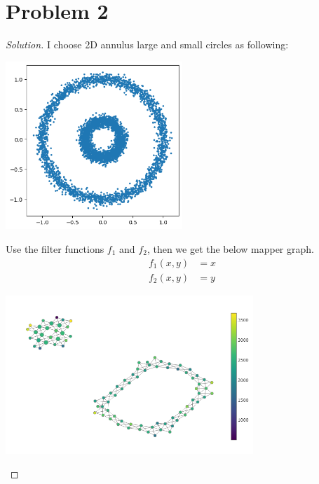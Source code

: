\section*{Problem 2}
	\begin{proof} [Solution]
		I choose 2D annulus large and small circles as following:
		\begin{center}
			\includegraphics[width=0.5\textwidth]{annulus.png}
		\end{center}
		Use the filter functions $f_1$ and $f_2$, then we get the below mapper graph.
		\begin{align*}
			f_1(x,y) &= x\\
			f_2(x,y) &= y
		\end{align*}
		\begin{center}
			\includegraphics[width=0.7\textwidth]{graph.png}
		\end{center}
	\end{proof}